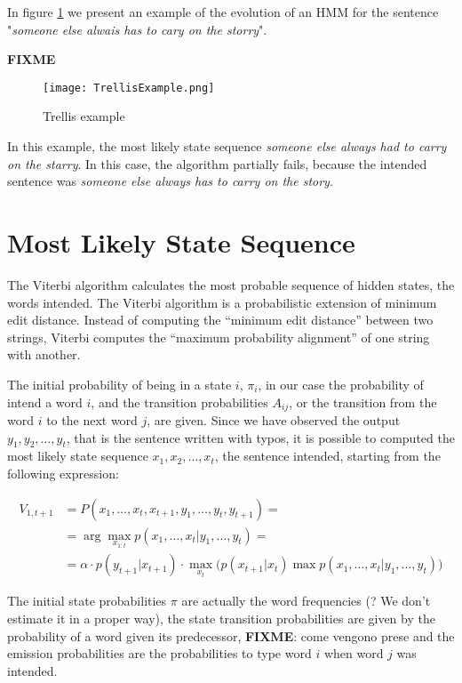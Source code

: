In figure \ref{fig:trellis} we present an example of the evolution of an HMM for the sentence "\textsl{someone 
	else alwais has to cary on the storry}".

\textbf{FIXME}
\begin{figure}[H]
	\centering
	\texttt{[image: TrellisExample.png]}
	\caption{Trellis example}
	\label{fig:trellis}
\end{figure}

In this example, the most likely state sequence \textsl{someone else always had to carry on the starry}. In this 
case, the algorithm partially fails, because the intended sentence was \textsl{someone else always has to carry 
	on the story}.


\section{Most Likely State Sequence}

The Viterbi algorithm calculates the most probable sequence of hidden states, the words intended.
The Viterbi algorithm is a probabilistic extension of minimum edit distance. Instead of computing the “minimum 
edit distance” between two strings, Viterbi computes the “maximum probability alignment” of one string with 
another. 

The initial probability of being in a state $i$, $\pi_i$, in our case the probability of intend a word $i$, and the 
transition probabilities $A_{ij}$, or the transition from the word $i$ to the next word $j$, are given. Since we have 
observed the output $y_1, y_2, \dots , y_t$, that is the sentence written with typos, it is possible to computed the most 
likely state sequence $x_1, x_2, \dots , x_t$, the sentence intended, starting from the following expression:

\begin{equation}
\begin{aligned}
V_{1,t+1} &= P(x_1, \dots, x_t, x_{t+1}, y_1, \dots, y_t,  y_{t+1}) = \\
&= \arg\max_{x_{1:t}} p(x_1, \dots, x_t | y_1, \dots, y_t) = \\
& =  \alpha \cdot p(y_{t+1}|x_{t+1})\cdot\max_{x_t} \Big( p(x_{t+1}|x_t) \max p(x_1, \dots, x_{t}|y_1, 
\dots, y_t)\Big)
\end{aligned}
\end{equation}

The initial state probabilities $\pi$ are actually the word frequencies (? We don’t estimate it in a proper way), the state 
transition probabilities are given by the probability of a word given its predecessor, \textbf{FIXME}: {come vengono prese} 
and the emission probabilities are the probabilities to type word $i$ when word $j$ was intended.

